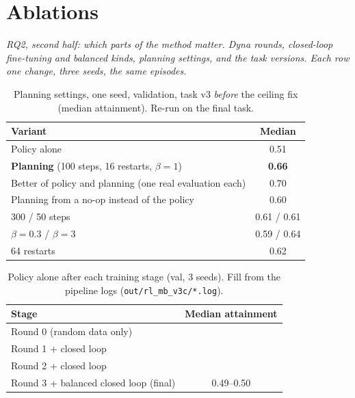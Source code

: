 \documentclass[12pt, a4paper]{book}
\newcommand{\plan}[1]{{\color{gray}\itshape #1\par}}
\begin{document}
\section{Ablations}
\label{sec:eval-ablations}
\plan{RQ2, second half: which parts of the method matter. Dyna rounds, closed-loop fine-tuning and balanced kinds, planning settings, and the task versions. Each row one change, three seeds, the same episodes.}

\begin{table}[ht]
  \centering
  \caption[Planning ablation]{Planning settings, one seed, validation, task v3 \emph{before} the ceiling fix (median attainment). Re-run on the final task.}
  \label{tab:eval-planning-ablation}
  \begin{tabular}{lc}
    \toprule
    Variant & Median \\
    \midrule
    Policy alone & 0.51 \\
    \textbf{Planning} (100 steps, 16 restarts, $\beta=1$) & \textbf{0.66} \\
    Better of policy and planning (one real evaluation each) & 0.70 \\
    Planning from a no-op instead of the policy & 0.60 \\
    300 / 50 steps & 0.61 / 0.61 \\
    $\beta = 0.3$ / $\beta = 3$ & 0.59 / 0.64 \\
    64 restarts & 0.62 \\
    \bottomrule
  \end{tabular}
\end{table}

\begin{table}[ht]
  \centering
  \caption[Training-pipeline ablation]{Policy alone after each training stage (val, 3 seeds). Fill from the pipeline logs (\texttt{out/rl\_mb\_v3c/*.log}).}
  \label{tab:eval-pipeline-ablation}
  \begin{tabular}{lc}
    \toprule
    Stage & Median attainment \\
    \midrule
    Round 0 (random data only) & \\
    Round 1 + closed loop & \\
    Round 2 + closed loop & \\
    Round 3 + balanced closed loop (final) & 0.49--0.50 \\
    \bottomrule
  \end{tabular}
\end{table}
\end{document}
